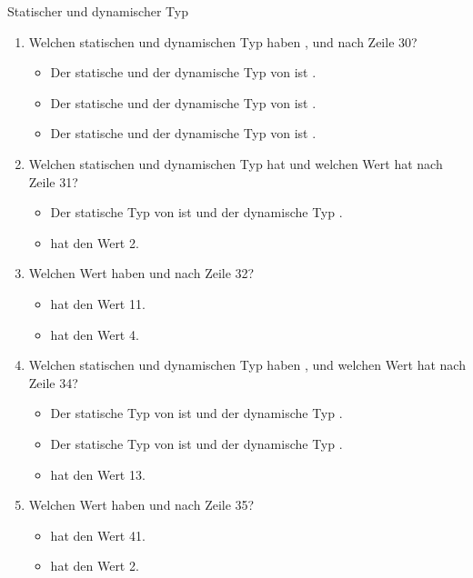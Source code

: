 \documentclass{../preamble}
\begin{document}
\begin{task}[credit = \stars{2}{3}]{Statischer und dynamischer Typ}
    \begin{solution}
        \begin{enumerate}[label = (\arabic*)]
            \item Welchen statischen und dynamischen Typ haben ,  und  nach Zeile 30?
                  \begin{itemize}
                      \item Der statische und der dynamische Typ von  ist .
                      \item Der statische und der dynamische Typ von  ist .
                      \item Der statische und der dynamische Typ von  ist .
                  \end{itemize}
            \item Welchen statischen und dynamischen Typ hat  und welchen Wert hat  nach Zeile 31?
                  \begin{itemize}
                      \item Der statische Typ von  ist  und der dynamische Typ .
                      \item {} hat den Wert 2.
                  \end{itemize}
            \item Welchen Wert haben  und  nach Zeile 32?
                  \begin{itemize}
                      \item {} hat den Wert 11.
                      \item {} hat den Wert 4.
                  \end{itemize}
            \item Welchen statischen und dynamischen Typ haben ,  und welchen Wert hat  nach Zeile 34?
                  \begin{itemize}
                      \item Der statische Typ von  ist  und der dynamische Typ .
                      \item Der statische Typ von  ist  und der dynamische Typ .
                      \item {} hat den Wert 13.
                  \end{itemize}
            \item Welchen Wert haben  und  nach Zeile 35?
                  \begin{itemize}
                      \item {} hat den Wert 41.
                      \item {} hat den Wert 2.
                  \end{itemize}
        \end{enumerate}
    \end{solution}
\end{task}
\end{document}
